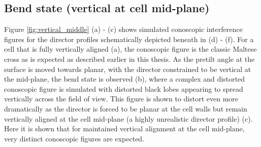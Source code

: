 \subsection{Bend state (vertical at cell mid-plane)}
Figure \ref{fig:vertical_middle} (a) - (c) shows simulated conoscopic interference figures for the director profiles schematically depicted beneath in (d) - (f). For a cell that is fully vertically aligned (a), the conoscopic figure is the classic Maltese cross as is expected as described earlier in this thesis. As the pretilt angle at the surface is moved towards planar, with the director constrained to be vertical at the mid-plane, the bend state is observed (b), where a complex and distorted conoscopic figure is simulated with distorted black lobes appearing to spread vertically across the field of view. This figure is shown to distort even more dramatically as the director is forced to be planar at the cell walls but remain vertically aligned at the cell mid-plane (a highly unrealistic director profile) (c). Here it is shown that for maintained vertical alignment at the cell mid-plane, very distinct conoscopic figures are expected.
